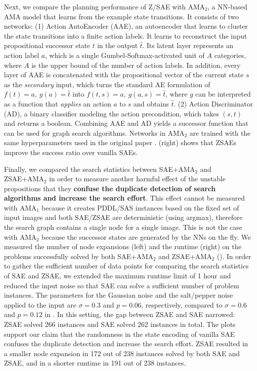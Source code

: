 Next, we compare the planning performance of Z/SAE with AMA$_2$,
a NN-based AMA model that learns from the example state transitions.
It consists of two networks:
(1) Action AutoEncoder (AAE), an autoencoder that learns to cluster the state transitions into a finite action labels.
It learns to reconstruct the input propositional successor state $t$ in the output $\hat{t}$.
Its latent layer represents an action label $a$, which is a single Gumbel-Softmax-activated unit of $A$ categories,
where $A$ is the upper bound of the number of action labels.
In addition, every layer of AAE is concatenated with the propositional vector of the current state $s$ as the \emph{secondary} input,
which turns the standard AE formulation of $f(t)=a,\ g(a)=\hat{t}$ into $f(t,s)=a,\ g(a,s)=\hat{t}$,
where $g$ can be interpreted as a function that \emph{applies} an action $a$ to $s$ and obtains $\hat{t}$.
(2) Action Discriminator (AD), a binary classifier modeling the action precondition, which takes $(s,t)$ and returns a boolean.
Combining AAE and AD yields a successor function that can be used for graph search algorithms.
Networks in AMA$_2$ are trained with the same hyperparameters used in the original paper \cite{Asai2018}.
 (right) shows that ZSAEs improve the success ratio over vanilla SAEs.

Finally, we compared the search statistics between SAE+AMA$_2$ and ZSAE+AMA$_2$
in order to measure another harmful effect of the unstable propositions
that they \textbf{confuse the duplicate detection of search algorithms and increase the search effort}.
% 
This effect cannot be measured with AMA$_1$
because it creates PDDL/SAS instances based on the fixed set of
input images and both SAE/ZSAE are deterministic (using argmax),
therefore the search graph contains a single node for a single image.
This is not the case with AMA$_2$ because the successor states
are generated by the NNs on the fly.
% 
We measured the number of node expansions (left) and the runtime (right)
on the problems successfully solved by both SAE+AMA$_2$ and ZSAE+AMA$_2$ ().
% 
In order to gather the sufficient number of data points for comparing the search statistics of SAE and ZSAE,
we extended the maximum runtime limit of 1 hour
and reduced the input noise so that SAE can solve a sufficient number of problem instances.
The parameters for the Gaussian noise and the salt/pepper noise applied to the input
are $\sigma=0.3$ and $p=0.06$, respectively, compared to $\sigma=0.6$ and $p=0.12$ in .
In this setting, the gap between ZSAE and SAE narrowed: ZSAE solved 266 instances and SAE solved 262 instances in total.
% 
The plots support our claim that
the randomness in the state encoding of vanilla SAE confuses the duplicate detection and
increase the search effort.
% 
ZSAE resulted in a smaller node expansion in 172 out of 238 instances solved by both SAE and ZSAE,
and in a shorter runtime in 191 out of 238 instances.

